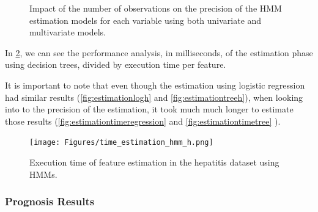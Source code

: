  \begin{figure}
  \begin{subfigmatrix}{2}
  \end{subfigmatrix}
  \caption{Impact of the number of observations on the precision of the HMM estimation models for each variable using both univariate and multivariate models.}
  \label{fig:estimationhmm}
\end{figure}
 
 In \ref{fig:estimationtimehmm}, we can see the performance analysis, in milliseconds, of the estimation phase using decision 
trees, divided by execution time per feature.

It is important to note that even though the estimation using logistic regression had similar results (\ref{fig:estimationlogh}
 and \ref{fig:estimationtreeh}), when looking into to the precision of the estimation, it took much much longer to estimate those results
 (\ref{fig:estimationtimeregression} and \ref{fig:estimationtimetree} ).
 
 \begin{figure}
  \centering
  \texttt{[image: Figures/time\_estimation\_hmm\_h.png]}
  \caption{Execution time of feature estimation in the hepatitis dataset using HMMs.}
  \label{fig:estimationtimehmm}
\end{figure}

\subsubsection{Prognosis Results}
\label{subsubsection:prognosis_hmm}

